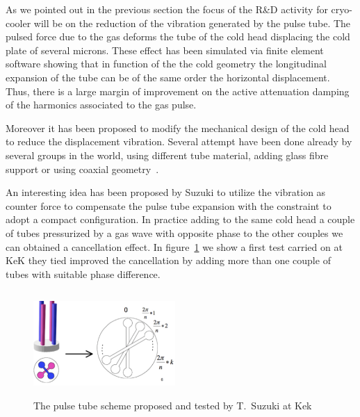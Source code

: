As we pointed out in the previous section the focus of the R\&D activity for cryo-cooler will be on the reduction of the vibration generated by the pulse tube.
The pulsed force due to the gas deforms the tube of the cold head displacing the cold plate of several microns. These effect has been simulated via finite element software showing that in function of the the cold geometry the longitudinal expansion of the tube can be of the same order the horizontal displacement.  Thus, there is a large margin of improvement on the active attenuation damping of the harmonics associated to the gas pulse.  

Moreover  it has been proposed to modify the mechanical design of the cold head to  reduce the displacement vibration. Several attempt have been done already by several groups in the world, using different tube material, adding glass fibre support or using coaxial geometry~\cite{Koettig}.

An interesting idea has been proposed by Suzuki  to utilize the vibration as counter force to compensate the pulse tube expansion with the constraint to adopt a compact configuration. In practice adding to the same cold head  a couple of tubes  pressurized by a  gas wave with opposite  phase  to the other couples we can obtained a cancellation effect.
In figure~\ref{fig:Suzuki} we show a first test carried on at KeK they tied improved  the cancellation  by adding more than one couple of tubes with suitable phase difference. 

\begin{figure}[htbp]
\begin{center}
\includegraphics[width=5.4cm, height=4cm] {./Sec_SiteInfra/Figures/Suzuki.pdf}
\caption{The pulse tube scheme proposed and tested by T.~Suzuki at Kek~\cite{Suzuki_2006}}
\label{fig:Suzuki}
\end{center}
\end{figure}



